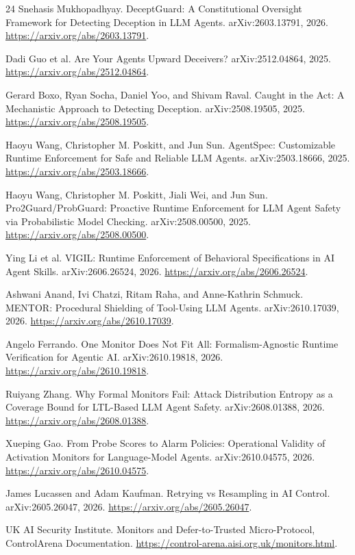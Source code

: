 \documentclass[11pt]{article}
\begin{document}
\begin{thebibliography}{24}
Snehasis Mukhopadhyay.
\newblock DeceptGuard: A Constitutional Oversight Framework for Detecting Deception in LLM Agents.
\newblock arXiv:2603.13791, 2026.
\newblock \url{https://arxiv.org/abs/2603.13791}.

Dadi Guo et al.
\newblock Are Your Agents Upward Deceivers?
\newblock arXiv:2512.04864, 2025.
\newblock \url{https://arxiv.org/abs/2512.04864}.

Gerard Boxo, Ryan Socha, Daniel Yoo, and Shivam Raval.
\newblock Caught in the Act: A Mechanistic Approach to Detecting Deception.
\newblock arXiv:2508.19505, 2025.
\newblock \url{https://arxiv.org/abs/2508.19505}.

Haoyu Wang, Christopher M. Poskitt, and Jun Sun.
\newblock AgentSpec: Customizable Runtime Enforcement for Safe and Reliable LLM Agents.
\newblock arXiv:2503.18666, 2025.
\newblock \url{https://arxiv.org/abs/2503.18666}.

Haoyu Wang, Christopher M. Poskitt, Jiali Wei, and Jun Sun.
\newblock Pro2Guard/ProbGuard: Proactive Runtime Enforcement for LLM Agent Safety via Probabilistic Model Checking.
\newblock arXiv:2508.00500, 2025.
\newblock \url{https://arxiv.org/abs/2508.00500}.

Ying Li et al.
\newblock VIGIL: Runtime Enforcement of Behavioral Specifications in AI Agent Skills.
\newblock arXiv:2606.26524, 2026.
\newblock \url{https://arxiv.org/abs/2606.26524}.

Ashwani Anand, Ivi Chatzi, Ritam Raha, and Anne-Kathrin Schmuck.
\newblock MENTOR: Procedural Shielding of Tool-Using LLM Agents.
\newblock arXiv:2610.17039, 2026.
\newblock \url{https://arxiv.org/abs/2610.17039}.

Angelo Ferrando.
\newblock One Monitor Does Not Fit All: Formalism-Agnostic Runtime Verification for Agentic AI.
\newblock arXiv:2610.19818, 2026.
\newblock \url{https://arxiv.org/abs/2610.19818}.

Ruiyang Zhang.
\newblock Why Formal Monitors Fail: Attack Distribution Entropy as a Coverage Bound for LTL-Based LLM Agent Safety.
\newblock arXiv:2608.01388, 2026.
\newblock \url{https://arxiv.org/abs/2608.01388}.

Xueping Gao.
\newblock From Probe Scores to Alarm Policies: Operational Validity of Activation Monitors for Language-Model Agents.
\newblock arXiv:2610.04575, 2026.
\newblock \url{https://arxiv.org/abs/2610.04575}.

James Lucassen and Adam Kaufman.
\newblock Retrying vs Resampling in AI Control.
\newblock arXiv:2605.26047, 2026.
\newblock \url{https://arxiv.org/abs/2605.26047}.

UK AI Security Institute.
\newblock Monitors and Defer-to-Trusted Micro-Protocol, ControlArena Documentation.
\newblock \url{https://control-arena.aisi.org.uk/monitors.html}.

\end{thebibliography}
\end{document}
